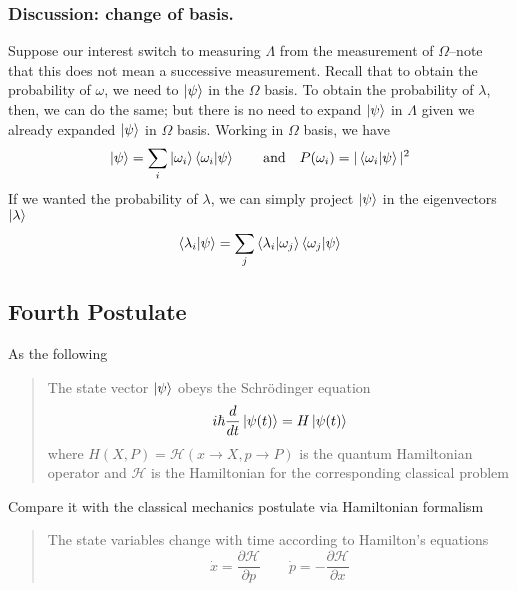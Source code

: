 \documentclass[../../../main.tex]{subfiles}
\begin{document}
\subsubsection{Discussion: change of basis.}
Suppose our interest switch to measuring $\Lambda$ from the measurement of $\Omega$--note that this does not mean a successive measurement.
Recall that to obtain the probability of $\omega$, we need to $\ket{\psi}$ in the $\Omega$ basis.
To obtain the probability of $\lambda$, then, we can do the same; but there is no need to expand $\ket{\psi}$ in $\Lambda$ given we already expanded $\ket{\psi}$ in $\Omega$ basis.
Working in $\Omega$ basis, we have 
\begin{equation*}
    \ket{\psi }=\sum_i \ket{\omega_i } \braket{\omega_i |\psi}\qquad\text{and}\quad P(\omega_i)=|\braket{\omega_i|\psi}|^2
\end{equation*}
If we wanted the probability of $\lambda$, we can simply project $\ket{\psi}$ in the eigenvectors $\ket{\lambda}$
\begin{equation*}
    \braket{\lambda_i|\psi}=\sum_j \braket{\lambda_i|\omega_j}\braket{\omega_j|\psi}
\end{equation*}


\subsection{Fourth Postulate}
As the following
\begin{quotation}
    The state vector $\ket{\psi}$ obeys the Schrödinger equation
    \begin{equation*}
        i\hbar \frac{d }{dt }\ket{\psi(t )}= H \ket{\psi(t)}
    \end{equation*}
    where $H(X,P)=\mathcal{H }(x\rightarrow X, p\rightarrow P  )$ is the quantum Hamiltonian operator and $\mathcal{H }$ is the Hamiltonian for the corresponding classical problem
\end{quotation}
Compare it with the classical mechanics postulate via Hamiltonian formalism
\begin{quotation}
The state variables change with time according to Hamilton's equations
\begin{equation*}
    \dot{x}=\frac{\partial \mathcal{H }}{\partial p}\qquad \dot{p }=-\frac{\partial \mathcal{H }}{\partial x}
\end{equation*}
\end{quotation}
\end{document}
